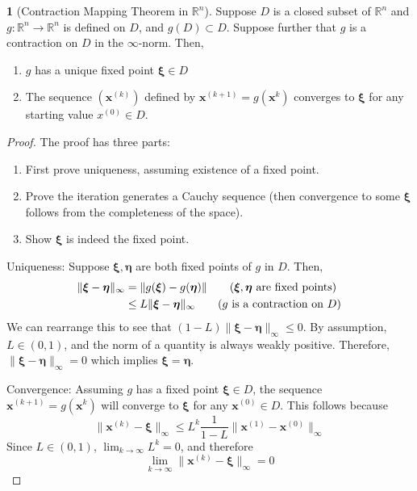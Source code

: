 \documentclass[12pt]{article}
\theoremstyle{definition}
\newcommand{\R}{\mathbb{R}}
\newcommand{\norm}[1]{\lVert#1\rVert}
\newcommand{\x}{\bm{x}}
\newcommand{\xib}{\bm{\xi}}
\newtheorem{theorem}{\color{ForestGreen}{\textbf{Theorem}}}
\theoremstyle{definition}
\begin{document}
\begin{theorem}[Contraction Mapping Theorem in $\R^n$]
Suppose $D$ is a closed subset of $\R^n$ and $g: \R^n \to \R^n$ is defined on $D$, and $g(D) \subset D$. Suppose further that $g$ is a contraction on $D$ in the $\infty$-norm. Then,
\begin{enumerate}
	\item $g$ has a unique fixed point $\xib \in D$
	\item The sequence $(\x^{(k)})$ defined by $\x^{(k+1)} = g(\x^{k})$ converges to $\xib$ for any starting value $x^{(0)} \in D$.
\end{enumerate}
\end{theorem}

\begin{proof}
The proof has three parts:
\begin{enumerate}
	\item First prove uniqueness, assuming existence of a fixed point.
	\item Prove the iteration generates a Cauchy sequence (then convergence to some $\xib$ follows from the completeness of the space).
	\item Show $\xib$ is indeed the fixed point.
\end{enumerate}

Uniqueness: Suppose $\xib, \bm \eta$ are both fixed points of $g$ in $D$. Then,
\begin{align*}
	\norm{\xib - \bm \eta}_\infty &= \norm{g(\xib) - g(\bm \eta)} \tag{$\xib, \bm \eta$ are fixed points} \\
	&\leq L \norm{\xib - \bm \eta}_\infty \tag{$g$ is a contraction on $D$}
\end{align*}
We can rearrange this to see that $(1-L)\norm{\xib - \bm \eta}_\infty \leq 0$. By assumption, $L\in (0,1)$, and the norm of a quantity is always weakly positive. Therefore, $\norm{\xib - \bm \eta}_\infty = 0$ which implies $\xib = \bm \eta$. 

Convergence: Assuming $g$ has a fixed point $\xib \in D$, the sequence $\x^{(k+1)} = g(\x^{k})$ will converge to $\xib$ for any $\x^{(0)} \in D$. This follows because
\begin{equation}
	\norm{\x^{(k)} - \xib}_\infty \leq L^k \frac{1}{1-L} \norm{\x^{(1)} - \x^{(0)}}_\infty
\end{equation}
Since $L \in (0,1)$, $\lim_{k\to\infty} L^k = 0$, and therefore
\begin{equation}
	\lim_{k \to \infty} \norm{\x^{(k)} - \xib}_\infty = 0
\end{equation}


\end{proof}
\end{document}
